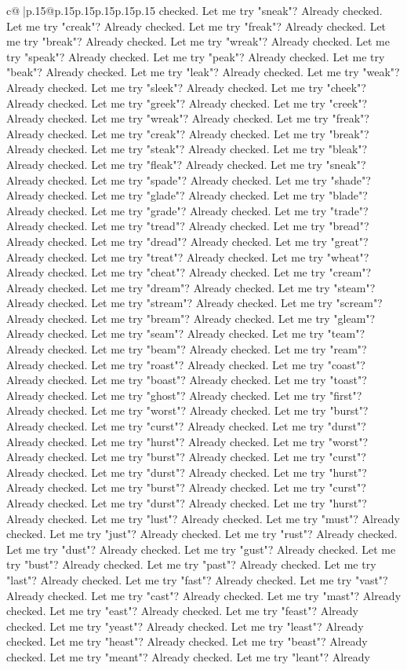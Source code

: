 \documentclass{article}
\begin{document}
{\begin{supertabular}{c@{$\;$}|p{.15\linewidth}@{}p{.15\linewidth}p{.15\linewidth}p{.15\linewidth}p{.15\linewidth}p{.15\linewidth}}
{{{checked. Let me try "sneak"? Already checked. Let me try "creak"? Already checked. Let me try "freak"? Already checked. Let me try "break"? Already checked. Let me try "wreak"? Already checked. Let me try "speak"? Already checked. Let me try "peak"? Already checked. Let me try "beak"? Already checked. Let me try "leak"? Already checked. Let me try "weak"? Already checked. Let me try "sleek"? Already checked. Let me try "cheek"? Already checked. Let me try "greek"? Already checked. Let me try "creek"? Already checked. Let me try "wreak"? Already checked. Let me try "freak"? Already checked. Let me try "creak"? Already checked. Let me try "break"? Already checked. Let me try "steak"? Already checked. Let me try "bleak"? Already checked. Let me try "fleak"? Already checked. Let me try "sneak"? Already checked. Let me try "spade"? Already checked. Let me try "shade"? Already checked. Let me try "glade"? Already checked. Let me try "blade"? Already checked. Let me try "grade"? Already checked. Let me try "trade"? Already checked. Let me try "tread"? Already checked. Let me try "bread"? Already checked. Let me try "dread"? Already checked. Let me try "great"? Already checked. Let me try "treat"? Already checked. Let me try "wheat"? Already checked. Let me try "cheat"? Already checked. Let me try "cream"? Already checked. Let me try "dream"? Already checked. Let me try "steam"? Already checked. Let me try "stream"? Already checked. Let me try "scream"? Already checked. Let me try "bream"? Already checked. Let me try "gleam"? Already checked. Let me try "seam"? Already checked. Let me try "team"? Already checked. Let me try "beam"? Already checked. Let me try "ream"? Already checked. Let me try "roast"? Already checked. Let me try "coast"? Already checked. Let me try "boast"? Already checked. Let me try "toast"? Already checked. Let me try "ghost"? Already checked. Let me try "first"? Already checked. Let me try "worst"? Already checked. Let me try "burst"? Already checked. Let me try "curst"? Already checked. Let me try "durst"? Already checked. Let me try "hurst"? Already checked. Let me try "worst"? Already checked. Let me try "burst"? Already checked. Let me try "curst"? Already checked. Let me try "durst"? Already checked. Let me try "hurst"? Already checked. Let me try "burst"? Already checked. Let me try "curst"? Already checked. Let me try "durst"? Already checked. Let me try "hurst"? Already checked. Let me try "lust"? Already checked. Let me try "must"? Already checked. Let me try "just"? Already checked. Let me try "rust"? Already checked. Let me try "dust"? Already checked. Let me try "gust"? Already checked. Let me try "bust"? Already checked. Let me try "past"? Already checked. Let me try "last"? Already checked. Let me try "fast"? Already checked. Let me try "vast"? Already checked. Let me try "cast"? Already checked. Let me try "mast"? Already checked. Let me try "east"? Already checked. Let me try "feast"? Already checked. Let me try "yeast"? Already checked. Let me try "least"? Already checked. Let me try "heast"? Already checked. Let me try "beast"? Already checked. Let me try "meant"? Already checked. Let me try "leant"? Already }}}
\end{supertabular}}
\end{document}
